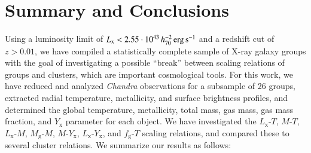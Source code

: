 \documentclass[structabstract]{aa}
\begin{document}
\section{Summary and Conclusions}\label{sec:summary}
Using a luminosity limit of
$L_{\text{x}}<2.55\cdot\unit[10^{43}\,h^{-2}_{70}]{erg\,s^{-1}}$ and a
redshift cut of $z >0.01$, we have compiled a statistically complete sample of
X-ray galaxy groups with the goal of investigating a possible
``break'' between scaling relations of groups and clusters, which are
important cosmological tools. For this work, we have reduced and analyzed
\emph{Chandra} observations for a subsample of 26 groups, extracted radial
temperature, metallicity, and surface brightness profiles, and determined the
global temperature, metallicity, total mass, gas mass, gas mass fraction, and
$Y_{\text{x}}$ parameter for each object. We have investigated the
$L_{\text{x}}$-$T$, $M$-$T$, $L_{\text{x}}$-$M$, $M_{\text{g}}$-$M$,
$M$-$Y_{\text{x}}$, $L_{\text{x}}$-$Y_{\text{x}}$, and $f_{\text{g}}$-$T$
scaling relations, and compared these to several cluster relations. We
summarize our results as follows:
\end{document}
